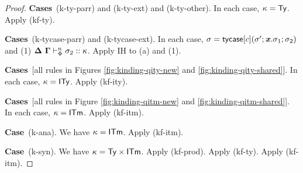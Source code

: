 \documentclass[12pt]{article}
\newcommand{\pfcase}[1]{\textbf{Case}~#1. }
\newcommand{\pfcases}[1]{\textbf{Cases}~#1. }
\begin{document}
\begin{proof}






\pfcases{(k-ty-parr) and (k-ty-ext) and (k-ty-other)} In each case, $\kappa={\sf Ty}$. Apply (kf-ty).

\pfcases{(k-tycase-parr) and (k-tycase-ext)} In each case, $\sigma={\sf tycase}[c](\sigma'; {\textbf{\textit{x}}}.\sigma_1; \sigma_2)$ and (1) $\boldsymbol\Delta~\boldsymbol\Gamma \vdash_{\Phi}^{n} \sigma_2 :: \kappa$. Apply IH to (a) and (1).

\pfcases{[all rules in Figures \ref{fig:kinding-qity-new} and \ref{fig:kinding-qity-shared}]} In each case, $\kappa={\sf ITy}$. Apply (kf-ity).

\pfcases{[all rules in Figure \ref{fig:kinding-qitm-new} and \ref{fig:kinding-qitm-shared}]} In each case, $\kappa={\sf ITm}$. Apply (kf-itm).

\pfcase{(k-ana)} We have $\kappa={\sf ITm}$. Apply (kf-itm).

\pfcase{(k-syn)} We have $\kappa={\sf Ty}\times{\sf ITm}$. Apply (kf-prod). Apply (kf-ty). Apply (kf-itm).
\end{proof}
\end{document}
